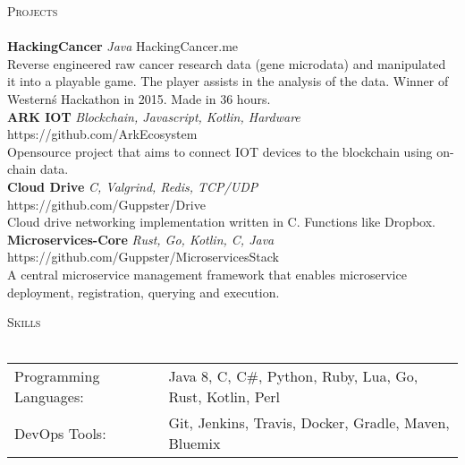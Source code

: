 \documentclass[a4paper]{article}
\newcommand{\lineunder} {
    \vspace*{-8pt} \\
    \hspace*{-18pt} \hrulefill \\
}
\newcommand{\header} [1] {
    {\hspace*{-18pt}\vspace*{6pt} \textsc{#1}}
    \vspace*{-6pt} \lineunder
}
\begin{document}
\header{Projects}
{\textbf{HackingCancer} \sl Java} \hfill HackingCancer.me\\
Reverse engineered raw cancer research data (gene microdata) and manipulated it into a playable game. The player assists in the analysis of the data. Winner of Western\'s Hackathon in 2015. Made in 36 hours.\\
\vspace*{2mm}
{\textbf{ARK IOT} \sl Blockchain, Javascript, Kotlin, Hardware} \hfill https://github.com/ArkEcosystem\\
Opensource project that aims to connect IOT devices to the blockchain using on-chain data.\\
\vspace*{2mm}
{\textbf{Cloud Drive} \sl C, Valgrind, Redis, TCP/UDP} \hfill https://github.com/Guppster/Drive\\
Cloud drive networking implementation written in C. Functions like Dropbox.\\
\vspace*{2mm}
{\textbf{Microservices-Core} \sl Rust, Go, Kotlin, C, Java} \hfill https://github.com/Guppster/MicroservicesStack\\
A central microservice management framework that enables microservice deployment, registration, querying and execution.\\

\vspace*{2mm}

\header{Skills}
\begin{tabular}{ l l }
	Programming Languages: & Java 8, C, C\#, Python, Ruby, Lua, Go, Rust, Kotlin, Perl \\
	DevOps Tools:          & Git, Jenkins, Travis, Docker, Gradle, Maven, Bluemix \\
\end{tabular}

\vspace*{2mm}

\vspace*{2mm}
        

\ 
\end{document}
